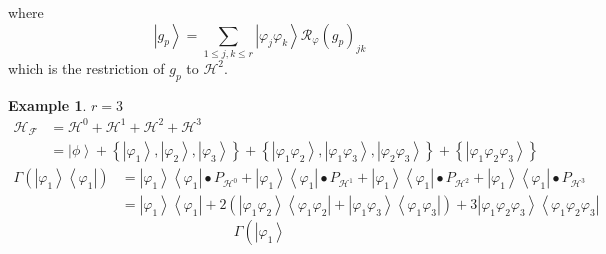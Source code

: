 \documentclass[aps,preprint]{revtex4}%
\newtheorem{example}[theorem]{Example}
\begin{document}
where
\begin{equation}
\left\vert g_{p}\right\rangle =\sum_{1\leq j,k\leq r}\left\vert \varphi
_{j}\varphi_{k}\right\rangle \mathcal{R}_{\varphi}\left(  g_{p}\right)  _{jk}%
\end{equation}
which is the restriction of $g_{p}$ to $\mathcal{H}^{2}.$

\begin{example}
$r=3$%
\begin{align}
\mathcal{H}_{\mathcal{F}}  &  =\mathcal{H}^{0}+\mathcal{H}^{1}+\mathcal{H}%
^{2}+\mathcal{H}^{3}\\
&  =\left\vert \phi\right\rangle +\left\{  \left\vert \mathcal{\varphi}%
_{1}\right\rangle ,\left\vert \mathcal{\varphi}_{2}\right\rangle ,\left\vert
\mathcal{\varphi}_{3}\right\rangle \right\}  +\left\{  \left\vert
\mathcal{\varphi}_{1}\mathcal{\varphi}_{2}\right\rangle ,\left\vert
\mathcal{\varphi}_{1}\mathcal{\varphi}_{3}\right\rangle ,\left\vert
\mathcal{\varphi}_{2}\mathcal{\varphi}_{3}\right\rangle \right\}  +\left\{
\left\vert \mathcal{\varphi}_{1}\mathcal{\varphi}_{2}\mathcal{\varphi}%
_{3}\right\rangle \right\}
\end{align}%
\begin{align}
\Gamma\left(  \left\vert \mathcal{\varphi}_{1}\right\rangle \left\langle
\mathcal{\varphi}_{1}\right\vert \right)   &  =\left\vert \mathcal{\varphi
}_{1}\right\rangle \left\langle \mathcal{\varphi}_{1}\right\vert \bullet
P_{\mathcal{H}^{0}}+\left\vert \mathcal{\varphi}_{1}\right\rangle \left\langle
\mathcal{\varphi}_{1}\right\vert \bullet P_{\mathcal{H}^{1}}+\left\vert
\mathcal{\varphi}_{1}\right\rangle \left\langle \mathcal{\varphi}%
_{1}\right\vert \bullet P_{\mathcal{H}^{2}}+\left\vert \mathcal{\varphi}%
_{1}\right\rangle \left\langle \mathcal{\varphi}_{1}\right\vert \bullet
P_{\mathcal{H}^{3}}\\
&  =\left\vert \mathcal{\varphi}_{1}\right\rangle \left\langle
\mathcal{\varphi}_{1}\right\vert +2\left(  \left\vert \mathcal{\varphi}%
_{1}\mathcal{\varphi}_{2}\right\rangle \left\langle \mathcal{\varphi}%
_{1}\mathcal{\varphi}_{2}\right\vert +\left\vert \mathcal{\varphi}%
_{1}\mathcal{\varphi}_{3}\right\rangle \left\langle \mathcal{\varphi}%
_{1}\mathcal{\varphi}_{3}\right\vert \right)  +3\left\vert \mathcal{\varphi
}_{1}\mathcal{\varphi}_{2}\mathcal{\varphi}_{3}\right\rangle \left\langle
\mathcal{\varphi}_{1}\mathcal{\varphi}_{2}\mathcal{\varphi}_{3}\right\vert
\end{align}%
\begin{equation}
\Gamma\left(  \overset{}{\left\vert \mathcal{\varphi}_{1}\right\rangle
}
\end{equation}
\end{example}
\end{document}
